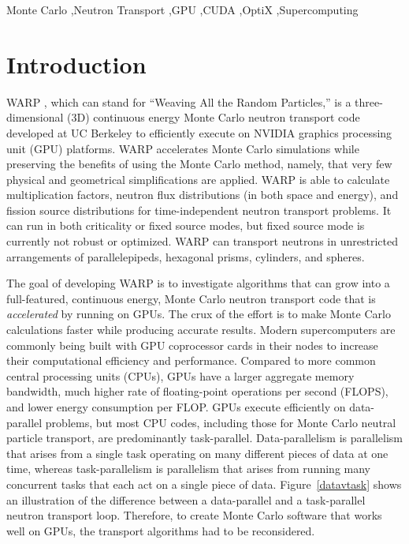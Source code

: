 \documentclass[preprint,12pt]{elsarticle}
\begin{document}
\begin{frontmatter}
\begin{abstract}
\end{abstract}

\begin{keyword}
Monte Carlo \sep Neutron Transport \sep GPU \sep CUDA \sep OptiX \sep Supercomputing


\end{keyword}

\end{frontmatter}

\linenumbers


\section{Introduction}
\label{sec:intro}

WARP \cite{algorithms}, which can stand for ``Weaving All the Random Particles,'' is a three-dimensional (3D) continuous energy Monte Carlo neutron transport code developed at UC Berkeley to efficiently execute on NVIDIA graphics processing unit (GPU) platforms.  WARP accelerates Monte Carlo simulations while preserving the benefits of using the Monte Carlo method, namely, that very few physical and geometrical simplifications are applied.  WARP is able to calculate multiplication factors, neutron flux distributions (in both space and energy), and fission source distributions for time-independent neutron transport problems.  It can run in both criticality or fixed source modes, but fixed source mode is currently not robust or optimized.  WARP can transport neutrons in unrestricted arrangements of parallelepipeds, hexagonal prisms, cylinders, and spheres.

The goal of developing WARP is to investigate algorithms that can grow into a full-featured, continuous energy, Monte Carlo neutron transport code that is \emph{accelerated} by running on GPUs.  The crux of the effort is to make Monte Carlo calculations faster while producing accurate results.  Modern supercomputers are commonly being built with GPU coprocessor cards in their nodes to increase their computational efficiency and performance.  Compared to more common central processing units (CPUs), GPUs have a larger aggregate memory bandwidth, much higher rate of floating-point operations per second (FLOPS), and lower energy consumption per FLOP.  GPUs execute efficiently on data-parallel problems, but most CPU codes, including those for Monte Carlo neutral particle transport, are predominantly task-parallel.  Data-parallelism is parallelism that arises from a single task operating on many different pieces of data at one time, whereas task-parallelism is parallelism that arises from running many concurrent tasks that each act on a single piece of data.  Figure~\ref{datavtask} shows an illustration of the difference between a data-parallel and a task-parallel neutron transport loop.  Therefore, to create Monte Carlo software that works well on GPUs, the transport algorithms had to be reconsidered. 
\end{document}
